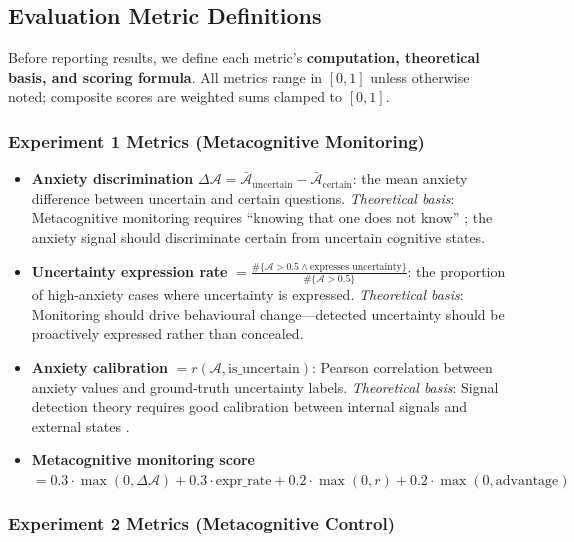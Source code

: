 \documentclass[pdflatex,sn-mathphys-num]{sn-jnl}
\newcommand{\anxiety}{\mathcal{A}}
\theoremstyle{thmstyleone}%
\theoremstyle{thmstyletwo}%
\theoremstyle{thmstylethree}%
\begin{document}
\subsection{Evaluation Metric Definitions}

Before reporting results, we define each metric's \textbf{computation, theoretical basis, and scoring formula}. All metrics range in $[0,1]$ unless otherwise noted; composite scores are weighted sums clamped to $[0,1]$.

\subsubsection{Experiment 1 Metrics (Metacognitive Monitoring)}

\begin{itemize}[leftmargin=2em]
    \item \textbf{Anxiety discrimination} $\Delta\anxiety = \bar{\anxiety}_{\text{uncertain}} - \bar{\anxiety}_{\text{certain}}$: the mean anxiety difference between uncertain and certain questions. \textit{Theoretical basis}: Metacognitive monitoring requires ``knowing that one does not know'' \cite{kawato2023metacognitive}; the anxiety signal should discriminate certain from uncertain cognitive states.

    \item \textbf{Uncertainty expression rate} $= \frac{\#\{\anxiety > 0.5 \wedge \text{expresses uncertainty}\}}{\#\{\anxiety > 0.5\}}$: the proportion of high-anxiety cases where uncertainty is expressed. \textit{Theoretical basis}: Monitoring should drive behavioural change---detected uncertainty should be proactively expressed rather than concealed.

    \item \textbf{Anxiety calibration} $= r(\anxiety, \text{is\_uncertain})$: Pearson correlation between anxiety values and ground-truth uncertainty labels. \textit{Theoretical basis}: Signal detection theory requires good calibration between internal signals and external states \cite{kawato2023metacognitive}.

    \item \textbf{Metacognitive monitoring score} $= 0.3 \cdot \max(0, \Delta\anxiety) + 0.3 \cdot \text{expr\_rate} + 0.2 \cdot \max(0, r) + 0.2 \cdot \max(0, \text{advantage})$
\end{itemize}

\subsubsection{Experiment 2 Metrics (Metacognitive Control)}
\end{document}
